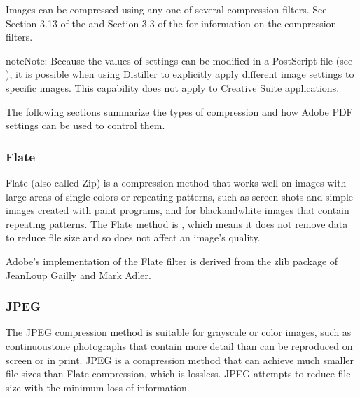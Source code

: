 \documentclass[letterpaper,12pt,english,openany,oneside]{sphinxmanual}
\begin{document}
Images can be compressed using any one of several compression filters. See Section 3.13 of the  and Section 3.3 of the  for information on the compression filters.

\begin{sphinxadmonition}{note}{Note:}
Because the values of settings can be modified in a PostScript file (see ), it is possible when using Distiller to explicitly apply different image settings to specific images. This capability does not apply to Creative Suite applications.
\end{sphinxadmonition}

The following sections summarize the types of compression and how Adobe PDF settings can be used to control them.




\subsubsection{Flate}
\label{\detokenize{PDF_Create_UsingSettings:flate}}
Flate (also called Zip) is a compression method that works well on images with large areas of single colors or repeating patterns, such as screen shots and simple images created with paint programs, and for black\sphinxhyphen{}and\sphinxhyphen{}white images that contain repeating patterns. The Flate method is  , which means it does not remove data to reduce file size and so does not affect an image’s quality.

Adobe’s implementation of the Flate filter is derived from the zlib package of Jean\sphinxhyphen{}Loup Gailly and Mark Adler.




\subsubsection{JPEG}
\label{\detokenize{PDF_Create_UsingSettings:jpeg}}
The JPEG compression method is suitable for grayscale or color images, such as continuous\sphinxhyphen{}tone photographs that contain more detail than can be reproduced on screen or in print. JPEG is a  compression method that can achieve much smaller file sizes than Flate compression, which is lossless. JPEG attempts to reduce file size with the minimum loss of information.
\end{document}
